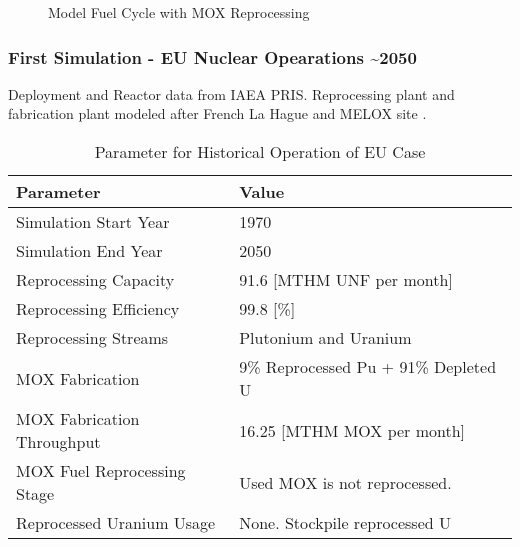 \begin{frame}
\begin{figure}
\begin{adjustbox}{max totalsize={0.9\textwidth}{.8\textheight}, center}
                \end{adjustbox}
                
                \caption{Model Fuel Cycle with \gls{MOX} Reprocessing}
                \label{diag:fc}
\end{figure}
\end{frame}

\begin{frame}
	\frametitle{First Simulation - EU Nuclear Opearations \textasciitilde 2050}
	Deployment and Reactor data from \gls{IAEA} \gls{PRIS}.
	Reprocessing plant and fabrication plant modeled after French La Hague and MELOX site
	\cite{schneider_spent_2008, hugelmann_melox_1999}.
		
\begin{table}[h]
	\centering
	\begin{tabularx}{\textwidth}{bb}
		\hline
		Parameter & Value \\
		\hline
		Simulation Start Year & 1970   \\
		Simulation End Year & 2050  \\ 
		Reprocessing Capacity & 91.6 [MTHM \gls{UNF} per month] \cite{schneider_spent_2008}  \\
		Reprocessing Efficiency & 99.8 [\%] \\
		Reprocessing Streams & Plutonium and Uranium  \\
		\gls{MOX} Fabrication & \small{9\% Reprocessed Pu + 91\% Depleted U} \\
		\gls{MOX} Fabrication Throughput & 16.25 [MTHM \gls{MOX} per month]  \cite{hugelmann_melox_1999} \\
		\gls{MOX} Fuel Reprocessing Stage &  Used \gls{MOX} is not reprocessed. \\  
		Reprocessed Uranium Usage &  None. Stockpile reprocessed U \\
		\hline
	\end{tabularx}
	\caption {Parameter for Historical Operation of \gls{EU} Case}
	\label{tab:sim_eu}
\end{table}
	
\end{frame}

